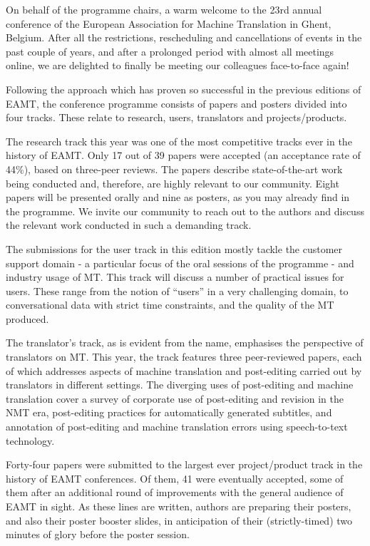 \documentclass[a4paper,11pt,twoside]{book}
\begin{document}
\begin{onehalfspacing}
On behalf of the programme chairs, a warm welcome to the 23rd annual conference of the European Association for Machine Translation in Ghent, Belgium. After all the restrictions, rescheduling and cancellations of events in the past couple of years, and after a prolonged period with almost all meetings online, we are delighted to finally be meeting our colleagues face-to-face again!

Following the approach which has proven so successful in the previous editions of EAMT, the conference programme consists of papers and posters divided into four tracks. These relate to research, users, translators and projects/products.

The research track this year was one of the most competitive tracks ever in the history of EAMT. Only 17 out of 39 papers were accepted (an acceptance rate of 44\%), based on three-peer reviews. The papers describe state-of-the-art work being conducted and, therefore, are highly relevant to our community.  Eight papers will be presented orally and nine as posters, as you may already find in the programme. We invite our community to reach out to the authors and discuss the relevant work conducted in such a demanding track.

The submissions for the user track in this edition mostly tackle the customer support domain - a particular focus of the oral sessions of the programme - and industry usage of MT. This track will discuss a number of practical issues for users. These range from the notion of “users” in a very challenging domain, to conversational data with strict time constraints, and the quality of the MT produced.

The translator's track, as is evident from the name, emphasises the perspective of translators on MT. This year, the track features three peer-reviewed papers, each of which addresses aspects of machine translation and post-editing carried out by translators in different settings. The diverging uses of post-editing and machine translation cover a survey of corporate use of post-editing and revision in the NMT era, post-editing practices for automatically generated subtitles, and annotation of post-editing and machine translation errors using speech-to-text technology.

Forty-four papers were submitted to the largest ever project/product track in the history of EAMT conferences. Of them, 41 were eventually accepted, some of them after an additional round of improvements with the general audience of EAMT in sight. As these lines are written, authors are preparing their posters, and also their poster booster slides, in anticipation of their (strictly-timed) two minutes of glory before the poster session.


\end{onehalfspacing}
\end{document}
